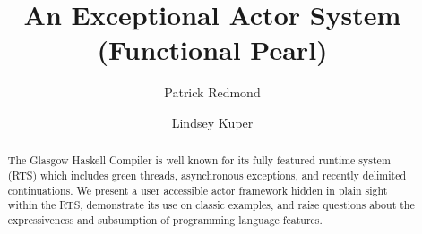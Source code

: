 \documentclass[sigplan,screen,review,anonymous]{acmart}
\begin{document}
\title{An Exceptional Actor System (Functional Pearl)}

\author{Patrick Redmond}
\author{Lindsey Kuper}


\begin{abstract}
    The Glasgow Haskell Compiler is well known for its fully featured runtime
    system (RTS) which includes green threads, asynchronous exceptions, and
    recently delimited continuations.
    We present a user accessible actor framework hidden in plain sight within
    the RTS, demonstrate its use on classic examples, and raise questions about
    the expressiveness and subsumption of programming language features.
\end{abstract}

\end{document}
